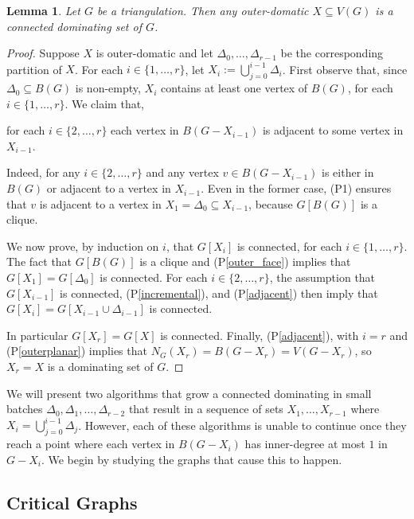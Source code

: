 \documentclass[12pt]{article}
\newcommand{\pref}[1]{(P\ref{#1})}
\newtheorem{lem}{Lemma}
\begin{document}
\begin{lem}\label{outer_domatic}
    Let $G$ be a triangulation.  Then any outer-domatic $X\subseteq V(G)$ is a connected dominating set of $G$.
\end{lem}

\begin{proof}
  Suppose $X$ is outer-domatic and let $\Delta_0,\ldots,\Delta_{r-1}$ be the corresponding partition of $X$.  For each $i\in\{1,\ldots,r\}$, let $X_i:=\bigcup_{j=0}^{i-1} \Delta_i$.  First observe that, since $\Delta_0\subseteq B(G)$ is non-empty, $X_i$ contains at least one vertex of $B(G)$, for each $i\in\{1,\ldots,r\}$. We claim that,
  \begin{compactenum}[(P1)]\setcounter{enumi}{3}
    \item for each $i\in\{2,\ldots,r\}$ each vertex in $B(G-X_{i-1})$ is adjacent to some vertex in $X_{i-1}$. \label{adjacent}
  \end{compactenum}
  Indeed, for any $i\in\{2,\ldots,r\}$ and any vertex $v\in B(G-X_{i-1})$ is either in $B(G)$ or adjacent to a vertex in $X_{i-1}$. Even in the former case, (P1) ensures that $v$ is adjacent to a vertex in $X_1=\Delta_0\subseteq X_{i-1}$, because $G[B(G)]$ is a clique.

  We now prove, by induction on $i$, that $G[X_i]$ is connected, for each $i\in\{1,\ldots,r\}$.
  The fact that $G[B(G)]$ is a clique and \pref{outer_face} implies that $G[X_1]=G[\Delta_0]$ is connected. For each $i\in\{2,\ldots,r\}$, the assumption that $G[X_{i-1}]$ is connected, \pref{incremental}, and \pref{adjacent} then imply that $G[X_i]=G[X_{i-1}\cup\Delta_{i-1}]$ is connected.

  In particular $G[X_r]=G[X]$ is connected.  Finally, \pref{adjacent}, with $i=r$ and \pref{outerplanar} implies that $N_G(X_r)=B(G-X_r)=V(G-X_r)$, so $X_r=X$ is a dominating set of $G$.
\end{proof}

We will present two algorithms that grow a connected dominating in small batches $\Delta_0,\Delta_1,\ldots,\Delta_{r-2}$ that result in a sequence of sets $X_1,\ldots,X_{r-1}$ where $X_{i}=\bigcup_{j=0}^{i-1}\Delta_j$.  However, each of these algorithms is unable to continue once they reach a point where each vertex in $B(G-X_i)$ has inner-degree at most $1$ in $G-X_i$.  We begin by studying the graphs that cause this to happen.

\subsection{Critical Graphs}
\end{document}

